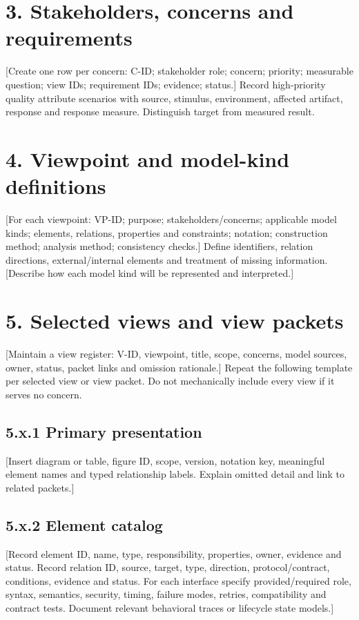 \documentclass[11pt,letterpaper]{article}
\begin{document}
\section*{3. Stakeholders, concerns and requirements}
[Create one row per concern: C-ID; stakeholder role; concern; priority; measurable question; view IDs; requirement IDs; evidence; status.] Record high-priority quality attribute scenarios with source, stimulus, environment, affected artifact, response and response measure. Distinguish target from measured result.\par\smallskip
\section*{4. Viewpoint and model-kind definitions}
[For each viewpoint: VP-ID; purpose; stakeholders/concerns; applicable model kinds; elements, relations, properties and constraints; notation; construction method; analysis method; consistency checks.] Define identifiers, relation directions, external/internal elements and treatment of missing information. [Describe how each model kind will be represented and interpreted.]\par\smallskip
\section*{5. Selected views and view packets}
[Maintain a view register: V-ID, viewpoint, title, scope, concerns, model sources, owner, status, packet links and omission rationale.] Repeat the following template per selected view or view packet. Do not mechanically include every view if it serves no concern.\par\smallskip
\subsection*{5.x.1 Primary presentation}
[Insert diagram or table, figure ID, scope, version, notation key, meaningful element names and typed relationship labels. Explain omitted detail and link to related packets.]\par\smallskip
\subsection*{5.x.2 Element catalog}
[Record element ID, name, type, responsibility, properties, owner, evidence and status. Record relation ID, source, target, type, direction, protocol/contract, conditions, evidence and status. For each interface specify provided/required role, syntax, semantics, security, timing, failure modes, retries, compatibility and contract tests. Document relevant behavioral traces or lifecycle state models.]\par\smallskip
\end{document}
